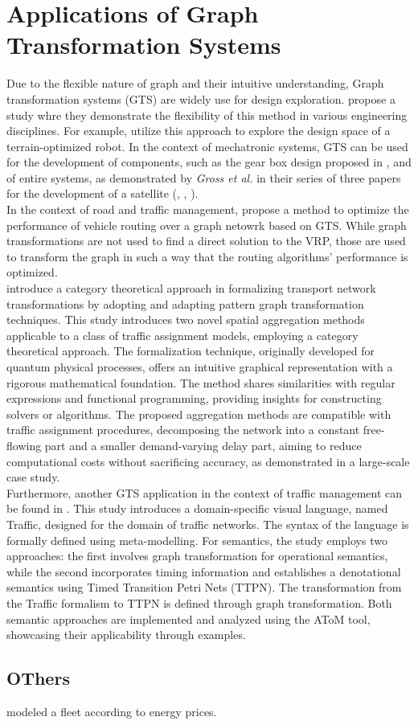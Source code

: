 \section{Applications of Graph Transformation Systems }
Due to the flexible nature of graph and their intuitive understanding, Graph transformation systems (GTS) are widely use for design exploration.  propose a study whre they demonstrate the flexibility of this method in various engineering disciplines. For example,  utilize this approach to explore the design space of a terrain-optimized robot. In the context of mechatronic systems, GTS can be used for the development of components, such as the gear box design proposed in , and of entire systems, as demonstrated by \textit{Gross et al.} in their series of three papers for the development of a satellite (\cite{gross2016a}, \cite{gross2016b}, \cite{gross2016c}). \\
In the context of road and traffic management,  propose a method to optimize the performance of vehicle routing over a graph netowrk based on GTS. While graph transformations are not used to find a direct solution to the VRP, those are used to transform the graph in such a way that the routing algorithms' performance is optimized. \\
introduce a category theoretical approach in formalizing transport network transformations by adopting and adapting pattern
graph transformation techniques. This study introduces two novel spatial aggregation methods applicable to a class of traffic assignment models, employing a category theoretical approach. The formalization technique, originally developed for quantum physical processes, offers an intuitive graphical representation with a rigorous mathematical foundation. The method shares similarities with regular expressions and functional programming, providing insights for constructing solvers or algorithms. The proposed aggregation methods are compatible with traffic assignment procedures, decomposing the network into a constant free-flowing part and a smaller demand-varying delay part, aiming to reduce computational costs without sacrificing accuracy, as demonstrated in a large-scale case study.\\
Furthermore, another GTS application in the context of traffic management can be found in . This study introduces a domain-specific visual language, named Traffic, designed for the domain of traffic networks. The syntax of the language is formally defined using meta-modelling. For semantics, the study employs two approaches: the first involves graph transformation for operational semantics, while the second incorporates timing information and establishes a denotational semantics using Timed Transition Petri Nets (TTPN). The transformation from the Traffic formalism to TTPN is defined through graph transformation. Both semantic approaches are implemented and analyzed using the AToM tool, showcasing their applicability through examples.

 
\subsection*{OThers}
 modeled a fleet according to energy prices.
